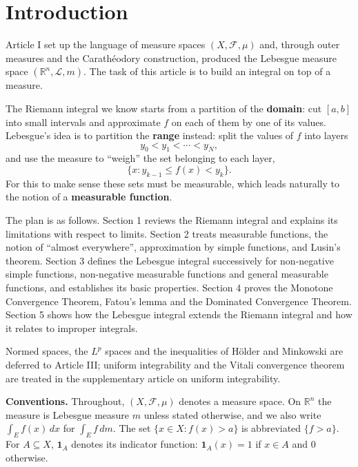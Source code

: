 \documentclass[11pt]{article}
\begin{document}
\maketitle

\section*{Introduction}

Article I set up the language of measure spaces $(X,\mathcal{F},\mu)$ and, through outer measures and the Carathéodory construction, produced the Lebesgue measure space $(\mathbb{R}^{n},\mathcal{L},m)$. The task of this article is to build an integral on top of a measure.

The Riemann integral we know starts from a partition of the \textbf{domain}: cut $[a,b]$ into small intervals and approximate $f$ on each of them by one of its values. Lebesgue's idea is to partition the \textbf{range} instead: split the values of $f$ into layers
\[
y_{0}<y_{1}<\cdots<y_{N},
\]
and use the measure to ``weigh'' the set belonging to each layer,
\[
\{x:y_{k-1}\leq f(x)<y_{k}\}.
\]
For this to make sense these sets must be measurable, which leads naturally to the notion of a \textbf{measurable function}.

The plan is as follows. Section 1 reviews the Riemann integral and explains its limitations with respect to limits. Section 2 treats measurable functions, the notion of ``almost everywhere'', approximation by simple functions, and Lusin's theorem. Section 3 defines the Lebesgue integral successively for non-negative simple functions, non-negative measurable functions and general measurable functions, and establishes its basic properties. Section 4 proves the Monotone Convergence Theorem, Fatou's lemma and the Dominated Convergence Theorem. Section 5 shows how the Lebesgue integral extends the Riemann integral and how it relates to improper integrals.

Normed spaces, the $L^{p}$ spaces and the inequalities of Hölder and Minkowski are deferred to Article III; uniform integrability and the Vitali convergence theorem are treated in the supplementary article on uniform integrability.

\textbf{Conventions.} Throughout, $(X,\mathcal{F},\mu)$ denotes a measure space. On $\mathbb{R}^{n}$ the measure is Lebesgue measure $m$ unless stated otherwise, and we also write $\int_{E}f(x)\,dx$ for $\int_{E}f\,dm$. The set $\{x\in X:f(x)>a\}$ is abbreviated $\{f>a\}$. For $A\subseteq X$, $\mathbf{1}_{A}$ denotes its indicator function: $\mathbf{1}_{A}(x)=1$ if $x\in A$ and $0$ otherwise.
\end{document}
